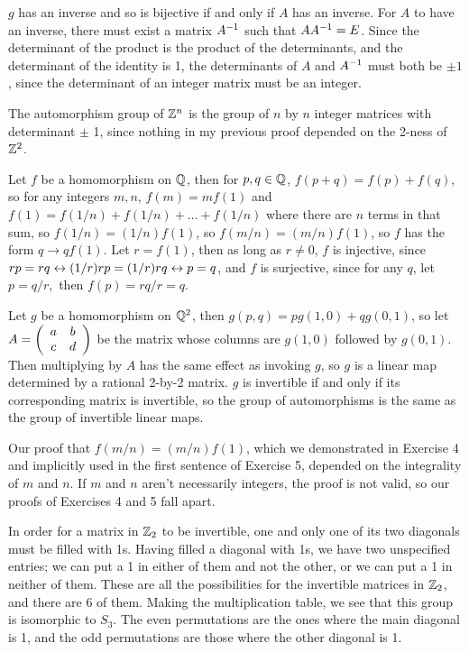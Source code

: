 \documentclass[11pt, oneside]{article}   	%
\begin{document}
$g$ has an inverse and so is bijective if and only if $A$ has an inverse. For $A$ to have an inverse, there must exist a matrix $A^{-1}$ such that $AA^{-1} = E$. Since the determinant of the product is the product of the determinants, and the determinant of the identity is 1, the determinants of $A$ and $A^{-1}$ must both be $\pm 1$, since the determinant of an integer matrix must be an integer. 
\item The automorphism group of $\mathbb{Z}^n$ is the group of $n$ by $n$ integer matrices with determinant $\pm$ 1, since nothing in my previous proof depended on the 2-ness of $\mathbb{Z}^2$.
\item Let $f$ be a homomorphism on $\mathbb{Q}$, then for $p, q \in \mathbb{Q}$, $f(p + q) = f(p) + f(q)$, so for any integers $m, n$, $f(m) = mf(1)$ and $f(1) = f(1/n) + f(1/n) + \ldots + f(1/n)$ where there are $n$ terms in that sum, so $f(1/n) = (1/n)f(1)$, so $f(m/n) = (m/n)f(1)$, so $f$ has the form $q \to qf(1)$. Let $r = f(1)$, then as long as $r \not = 0$, $f$ is injective, since $rp = rq \leftrightarrow (1/r)rp = (1/r)rq \leftrightarrow p = q$, and $f$ is surjective, since for any $q$, let $p = q/r,$ then $f(p) = rq/r = q$. 
\item Let $g$ be a homomorphism on $\mathbb{Q}^2$, then $g(p, q) = pg(1, 0) + qg(0, 1)$, so let $A = \left( \begin{array}{ccc} a & b \\ c & d \end{array} \right)$ be the matrix whose columns are $g(1, 0)$ followed by $g(0, 1)$. Then multiplying by $A$ has the same effect as invoking $g$, so $g$ is a linear map determined by a rational 2-by-2 matrix. $g$ is invertible if and only if its corresponding matrix is invertible, so the group of automorphisms is the same as the group of invertible linear maps.
\item Our proof that $f(m/n) = (m/n)f(1)$, which we demonstrated in Exercise 4 and implicitly used in the first sentence of Exercise 5, depended on the integrality of $m$ and $n$. If $m$ and $n$ aren't necessarily integers, the proof is not valid, so our proofs of Exercises 4 and 5 fall apart.
\item \be
\item In order for a matrix in $\mathbb{Z}_2$ to be invertible, one and only one of its two diagonals must be filled with 1s. Having filled a diagonal with 1s, we have two unspecified entries; we can put a 1 in either of them and not the other, or we can put a 1 in neither of them. These are all the possibilities for the invertible matrices in $\mathbb{Z}_2$, and there are 6 of them. Making the multiplication table, we see that this group is isomorphic to $S_3$. The even permutations are the ones where the main diagonal is 1, and the odd permutations are those where the other diagonal is 1. 
\end{document}

